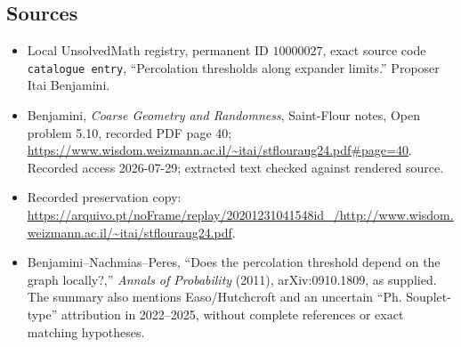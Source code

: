 \documentclass[11pt]{article}
\begin{document}
\subsection{Sources}
\begin{itemize}
\item Local UnsolvedMath registry, permanent ID \(10000027\), exact source code \texttt{catalogue entry}, ``Percolation thresholds along expander limits.'' Proposer Itai Benjamini.
\item Benjamini, \emph{Coarse Geometry and Randomness}, Saint-Flour notes, Open problem 5.10, recorded PDF page 40; \url{https://www.wisdom.weizmann.ac.il/~itai/stflouraug24.pdf#page=40}. Recorded access 2026-07-29; extracted text checked against rendered source.
\item Recorded preservation copy: \url{https://arquivo.pt/noFrame/replay/20201231041548id_/http://www.wisdom.weizmann.ac.il/~itai/stflouraug24.pdf}.
\item Benjamini--Nachmias--Peres, ``Does the percolation threshold depend on the graph locally?,'' \emph{Annals of Probability} (2011), arXiv:0910.1809, as supplied. The summary also mentions Easo/Hutchcroft and an uncertain ``Ph. Souplet-type'' attribution in 2022--2025, without complete references or exact matching hypotheses.
\end{itemize}
\end{document}
